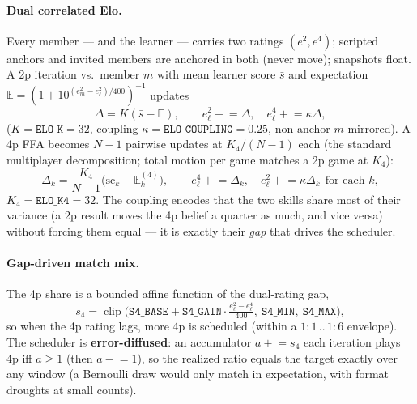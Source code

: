 \documentclass[11pt]{article}
\newcommand{\E}{\mathbb{E}}
\newcommand{\clip}{\operatorname{clip}}
\newcommand{\cd}[1]{\texttt{#1}}
\begin{document}
\paragraph{Dual correlated Elo.} Every member --- and the learner --- carries two ratings $(e^2,e^4)$;
scripted anchors and invited members are anchored in both (never move); snapshots float. A 2p iteration
vs.\ member $m$ with mean learner score $\bar s$ and expectation
$\E=(1+10^{(e^2_m-e^2_\ell)/400})^{-1}$ updates
\begin{equation}
\Delta=K(\bar s-\E),\qquad e^2_\ell\mathrel{+}=\Delta,\quad e^4_\ell\mathrel{+}=\kappa\Delta,
\end{equation}
($K=\cd{ELO\_K}=32$, coupling $\kappa=\cd{ELO\_COUPLING}=0.25$, non-anchor $m$ mirrored). A 4p FFA becomes
$N{-}1$ pairwise updates at $K_4/(N{-}1)$ each (the standard multiplayer decomposition; total motion per
game matches a 2p game at $K_4$):
\begin{equation}
\Delta_k=\frac{K_4}{N-1}\big(\mathrm{sc}_k-\E^{(4)}_k\big),\qquad
e^4_\ell\mathrel{+}=\Delta_k,\quad e^2_\ell\mathrel{+}=\kappa\Delta_k\ \ \text{for each }k,
\end{equation}
$K_4=\cd{ELO\_K4}=32$. The coupling encodes that the two skills share most of their variance (a 2p result
moves the 4p belief a quarter as much, and vice versa) without forcing them equal --- it is exactly their
\emph{gap} that drives the scheduler.

\paragraph{Gap-driven match mix.} The 4p share is a bounded affine function of the dual-rating gap,
\begin{equation}
s_4=\clip\!\Big(\cd{S4\_BASE}+\cd{S4\_GAIN}\cdot\tfrac{e^2_\ell-e^4_\ell}{400},\ \cd{S4\_MIN},\ \cd{S4\_MAX}\Big),
\end{equation}
so when the 4p rating lags, more 4p is scheduled (within a $1{:}1\,..\,1{:}6$ envelope). The scheduler is
\textbf{error-diffused}: an accumulator $a\mathrel{+}=s_4$ each iteration plays 4p iff $a\ge1$ (then
$a\mathrel{-}=1$), so the realized ratio equals the target exactly over any window (a Bernoulli draw would
only match in expectation, with format droughts at small counts).
\end{document}
